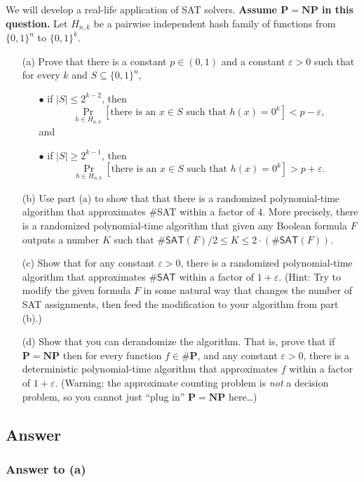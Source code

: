 \documentclass{article}
\renewcommand{\P}{\mathbf{P}}
\newcommand{\NP}{\mathbf{NP}}
\def \eps {{\varepsilon}}
\begin{document}
We will develop a real-life application of SAT solvers.
{\bf Assume $\mathbf{P}=\mathbf{NP}$ in this question.} Let $H_{n,k}$ be a pairwise independent hash family of functions from $\{0,1\}^n$ to $\{0,1\}^k$.
\begin{itemize}
	\item[(a)] Prove that there is a constant $p \in (0,1)$ and a constant $\eps > 0$ such that for every $k$ and  $S \subseteq \{0,1\}^n$, 
	
	\begin{itemize} 
	\item[$\bullet$] if $|S| \leq 2^{k-2}$, then \[\Pr_{h \in H_{n,k}}[\text{there is an $x \in S$ such that $h(x) = 0^k$}] < p - \eps,\] and
	\item[$\bullet$] if $|S| \geq 2^{k-1}$, then \[\Pr_{h \in H_{n,k}}[\text{there is an $x \in S$ such that $h(x) = 0^k$}] > p + \eps.\] 
\end{itemize}
		\item[(b)]
		Use part (a) to show that that there is a randomized polynomial-time algorithm that approximates \#\textsf{SAT} within a factor of 4. More precisely, there is a randomized polynomial-time algorithm that given any Boolean formula $F$ outputs a number $K$ such that $\#\textsf{SAT}(F)/2 \leq K \leq 2\cdot \left(\#\textsf{SAT}(F)\right)$.
	\item[(c)]
	Show that for any constant $\varepsilon>0$, there is a randomized polynomial-time algorithm that approximates $\#\textsf{SAT}$ within a factor of $1+\varepsilon$. (Hint: Try to modify the given formula $F$ in some natural way that changes the number of SAT assignments, then feed the modification to your algorithm from part (b).)
	\item[(d)]
		Show that you can derandomize the algorithm.	That is, prove that if $\P = \NP$ then for every function $f\in \#\mathbf{P}$, and any constant $\varepsilon>0$, there is a deterministic polynomial-time algorithm that approximates $f$ within a factor of $1+\varepsilon$. (Warning: the approximate counting problem is \emph{not} a decision problem, so you cannot just ``plug in'' $\P = \NP$ here\dots)
\end{itemize}

\newpage
\subsection*{Answer}
\subsubsection*{Answer to (a)}
\end{document}

